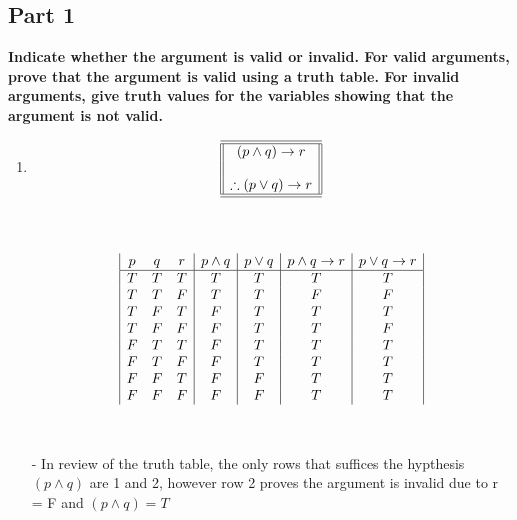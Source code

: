 \documentclass{amsart}
\theoremstyle{definition}
\theoremstyle{Exercise}
\theoremstyle{remark}
\theoremstyle{rule}
\numberwithin{equation}{section}
\begin{document}
\subsection*{Part 1}
{\bf Indicate whether the argument is valid or invalid. For valid arguments, prove that the argument is valid using a truth table. For invalid arguments, give truth values for the variables showing that the argument is not valid.}\\
 \begin{enumerate}

\item \[
\begin{array}{||c||}
\hline \hline
(p \land q) \to r\\
\\
\therefore (p \lor q) \to r\\
\hline \hline
\end{array}
\]\\\\

\begin{displaymath}
  \begin{array}{|c c c | c | c | c | c |}
    p & q & r & p \land q & p \lor q & p \land q \to r & p \lor q \to r\\
    \hline
    T & T & T & T & T & T & T\\
    T & T & F & T & T & F & F\\
    T & F & T & F & T & T & T\\
    T & F & F & F & T & T & F\\
    F & T & T & F & T & T & T\\
    F & T & F & F & T & T & T\\
    F & F & T & F & F & T & T\\
    F & F & F & F & F & T & T\\
  \end{array}
\end{displaymath}
  \\\\
  - In review of the truth table, the only rows that suffices the hypthesis $ (p \land q)$ are 1 and 2, however row 2 proves the argument is invalid due to r = F and $ (p \land q) = T$\\
  \\\\
    \end{enumerate}
\end{document}
